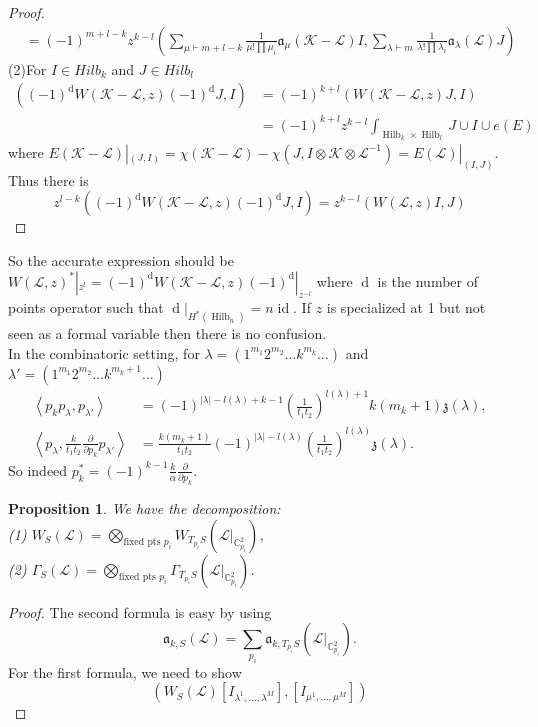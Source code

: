 \documentclass{article}
\newtheorem{prop}{Proposition}[theorem]
\renewcommand{\frak}[1]{\mathfrak{#1}}
\newcommand{\cc}[1]{\mathcal{#1}}
\newcommand{\bb}[1]{\mathbb{#1}}
\newcommand{\lr}[1]{\left({#1}\right)}
\newcommand{\inprod}[1]{\left<{#1}\right>}
\DeclareMathOperator{\dd}{d}
\DeclareMathOperator{\Hilb}{Hilb}
\DeclareMathOperator{\id}{id}
\newcommand{\p}{\partial}
\begin{document}
\begin{proof}
\[\begin{aligned}
&=(-1)^{m+l-k}z^{k-l}\lr{\sum_{\mu\vdash m+l-k}\frac{1}{\mu!\prod \mu_i}\frak{a}_{\mu}(\cc{K-L})I,\sum_{\lambda\vdash m}\frac{1}{\lambda!\prod \lambda_i}\frak{a}_{\lambda}(\cc{L})J}
\end{aligned}
\]
(2)For $I\in Hilb_k$ and $J\in Hilb_l$
\[
\begin{aligned}
\left((-1)^{\dd}W(\mathcal{K}-\mathcal{L},z)(-1)^{\dd}J,I\right)&=(-1)^{k+l}\left(W(\mathcal{K}-\mathcal{L},z)J,I\right)\\
&=(-1)^{k+l}z^{k-l}\int_{\Hilb_k\times \Hilb_l}J\cup I\cup e(E)
\end{aligned}
\]
where $E(\mathcal{K-L})|_{(J,I)}=\chi(\mathcal{K-L})-\chi(J,I\otimes\mathcal{K}\otimes\mathcal{L}^{-1})=E(\mathcal{L})|_{(I,J)}.$\\ 
Thus there is \[z^{l-k}\left((-1)^{\dd}W(\mathcal{K}-\mathcal{L},z)(-1)^{\dd}J,I\right)=z^{k-l}\left(W(\mathcal{L},z)I,J\right)\]
\end{proof}
So the accurate expression should be $W(\cc{L},z)^*|_{z^l}=(-1)^{\dd}W(\mathcal{K}-\mathcal{L},z)(-1)^{\dd}|_{z^{-l}}$ where $\dd$ is the number of points operator such that $\dd|_{H^*(\Hilb_n)}=n\id$. If $z$ is specialized at 1 but not seen as a formal variable then there is no confusion.\\

In the combinatoric setting, for $\lambda=(1^{m_1}2^{m_2}\ldots k^{m_k}\ldots)$ and $\lambda'=(1^{m_1}2^{m_2}\ldots k^{m_k+1}\ldots)$
\[
\begin{aligned}
\inprod{p_kp_\lambda,p_{\lambda'}}&=(-1)^{|\lambda|-l(\lambda)+k-1}\lr{\frac{1}{t_1t_2}}^{l(\lambda)+1}k(m_k+1)\frak{z}(\lambda),\\
\inprod{p_\lambda,\frac{k}{t_1t_2}\frac{\p}{\p p_k}p_{\lambda'}}&=\frac{k(m_k+1)}{t_1t_2}(-1)^{|\lambda|-l(\lambda)}\lr{\frac{1}{t_1t_2}}^{l(\lambda)}\frak{z}(\lambda).
\end{aligned}
\]
So indeed $p_k^* = (-1)^{k-1}\frac{k}{\alpha}\frac{\p}{\p p_k}$.

\begin{prop}
We have the decomposition:\\
(1) $W_S(\cc{L})=\bigotimes_{\text{fixed pts }p_i}W_{T_{p_i}S}\lr{\cc{L}|_{\bb{C}^2_{p_i}}}$,\\
(2) $\Gamma_S(\cc{L})=\bigotimes_{\text{fixed pts }p_i}\Gamma_{T_{p_i}S}\lr{\cc{L}|_{\bb{C}^2_{p_i}}}$.
\end{prop}
\begin{proof}
The second formula is easy by using \[\frak{a}_{k,S}(\cc{L})=\sum_{p_i}\frak{a}_{k,T_{p_i}S}(\cc{L}|_{\bb{C}_{p_i}^2}).\]
For the first formula, we need to show 
\[
\lr{W_S(\cc{L})[I_{\lambda^1,\ldots,\lambda^M}],[I_{\mu^1,\ldots,\mu^M}]}
\]
\end{proof}
\end{document}

